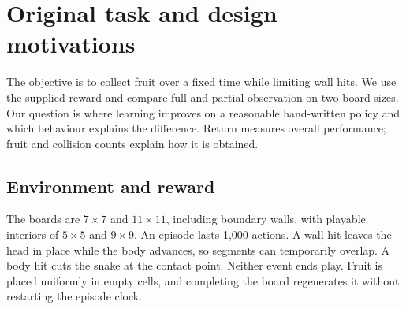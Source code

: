 \documentclass{article}
\begin{document}
\begingroup
\renewcommand{\thefootnote}{}
\endgroup
\begin{abstract}
We investigate how Snake's rules and observations shape DQN's behaviour. In the supplied task, a heuristic that accepts nonfatal body cuts makes visible-fruit pursuit efficient; DQN is competitive on the smaller full board but loses return through extra contacts on the larger one. With partial observation, DQN's main advantage over the tested heuristics is finding hidden fruit sooner. A separate Classic task makes collisions fatal and rewards board completion: full DQN wins 283 of 500 test games, while partial DQN wins four and often cycles. Learning curves and controlled continuations expose limitations that selected-checkpoint scores alone would hide.
\end{abstract}

\section{Original task and design motivations}
The objective is to collect fruit over a fixed time while limiting wall hits. We use the supplied reward and compare full and partial observation on two board sizes. Our question is where learning improves on a reasonable hand-written policy and which behaviour explains the difference. Return measures overall performance; fruit and collision counts explain how it is obtained.

\subsection{Environment and reward}
The boards are $7\times7$ and $11\times11$, including boundary walls, with playable interiors of $5\times5$ and $9\times9$. An episode lasts 1,000 actions. A wall hit leaves the head in place while the body advances, so segments can temporarily overlap. A body hit cuts the snake at the contact point. Neither event ends play. Fruit is placed uniformly in empty cells, and completing the board regenerates it without restarting the episode clock.
\end{document}
